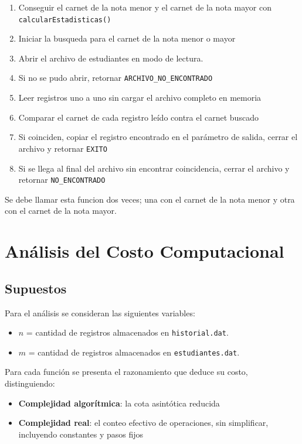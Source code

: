 \documentclass[12pt,letterpaper]{article}
\begin{document}
\begin{enumerate}
    \item Conseguir el carnet de la nota menor y el carnet de la nota mayor con \texttt{calcularEstadisticas()}
    \item Iniciar la busqueda para el carnet de la nota menor o mayor
    \item Abrir el archivo de estudiantes en modo de lectura.
    \item Si no se pudo abrir, retornar \texttt{ARCHIVO\_NO\_ENCONTRADO}
    \item Leer registros uno a uno sin cargar el archivo completo en memoria
    \item Comparar el carnet de cada registro leído contra el carnet buscado
    \item Si coinciden, copiar el registro encontrado en el parámetro de salida, cerrar el archivo y retornar \texttt{EXITO}
    \item Si se llega al final del archivo sin encontrar coincidencia, cerrar el archivo y retornar \texttt{NO\_ENCONTRADO}
\end{enumerate}

Se debe llamar esta funcion dos veces; una con el carnet de la nota menor y otra con el carnet de la nota mayor.

\section{Análisis del Costo Computacional}
\subsection{Supuestos}

Para el análisis se consideran las siguientes variables:

\begin{itemize}
    \item $n$ = cantidad de registros almacenados en \texttt{historial.dat}.
    \item $m$ = cantidad de registros almacenados en \texttt{estudiantes.dat}.
\end{itemize}

Para cada función se presenta el razonamiento que deduce su costo, distinguiendo:

\begin{itemize}
    \item \textbf{Complejidad algorítmica}: la cota asintótica reducida
    \item \textbf{Complejidad real}: el conteo efectivo de operaciones, sin simplificar, incluyendo constantes y pasos fijos
\end{itemize}
\end{document}
